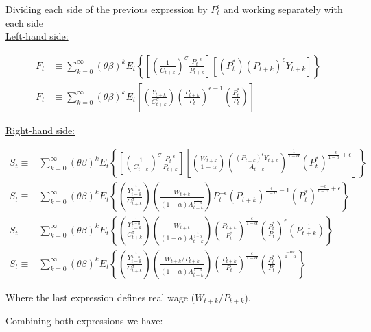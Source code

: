 \documentclass[11pt]{article}
\begin{document}
Dividing each side of the previous expression by $P_t^{\epsilon}$ and working separately with each side\\

\underline{Left-hand side:}

\begin{align*}
F_t&\equiv\sum_{k=0}^{\infty}(\theta\beta)^k E_t\left\{ \left[\left(\frac{1}{C_{t+k}}\right)^{\sigma}\frac{P_t^{-\epsilon}}{P_{t+k}}\right]\left[(P_t^*)(P_{t+k})^{\epsilon}Y_{t+k}\right]\right\}\\
F_t&\equiv\sum_{k=0}^{\infty}(\theta\beta)^k E_t\left[\left(\frac{Y_{t+k}}{C_{t+k}^{\sigma}}\right)\left(\frac{P_{t+k}}{P_{t}}\right)^{\epsilon-1}\left(\frac{P_t^*}{P_{t}}\right)\right]
\end{align*}

\underline{Right-hand side:}

\begin{align*}
S_t\equiv&\sum_{k=0}^{\infty}(\theta\beta)^k E_t\left\{ \left[\left(\frac{1}{C_{t+k}}\right)^{\sigma}\frac{P_t^{-\epsilon}}{P_{t+k}}\right]\left[\left(\frac{W_{t+k}}{1-\alpha}\right)\left(\frac{(P_{t+k})^{\epsilon}Y_{t+k}}{A_{t+k}}\right)^{\frac{1}{1-\alpha}}(P_t^*)^{\frac{-\epsilon}{1-\alpha}+\epsilon}\right]\right\}\\
S_t\equiv&\sum_{k=0}^{\infty}(\theta\beta)^k E_t\left\{ \left(\frac{Y_{t+k}^{\frac{1}{1-\alpha}}}{C_{t+k}^{\sigma}}\right)\left(\frac{W_{t+k}}{(1-\alpha)A_{t+k}^{\frac{1}{1-\alpha}}}\right)P_t^{-\epsilon}(P_{t+k})^{\frac{\epsilon}{1-\alpha}-1}(P_t^*)^{\frac{-\epsilon}{1-\alpha}+\epsilon}\right\}\\
S_t\equiv&\sum_{k=0}^{\infty}(\theta\beta)^k E_t\left\{ \left(\frac{Y_{t+k}^{\frac{1}{1-\alpha}}}{C_{t+k}^{\sigma}}\right)\left(\frac{W_{t+k}}{(1-\alpha)A_{t+k}^{\frac{1}{1-\alpha}}}\right)\left(\frac{P_{t+k}}{P_t^*}\right)^{\frac{\epsilon}{1-\alpha}}\left(\frac{P_{t}^*}{P_t}\right)^{\epsilon}(P_{t+k}^{-1})\right\}\\
S_t\equiv&\sum_{k=0}^{\infty}(\theta\beta)^k E_t\left\{ \left(\frac{Y_{t+k}^{\frac{1}{1-\alpha}}}{C_{t+k}^{\sigma}}\right)\left(\frac{W_{t+k}/P_{t+k}}{(1-\alpha)A_{t+k}^{\frac{1}{1-\alpha}}}\right)\left(\frac{P_{t+k}}{P_t}\right)^{\frac{\epsilon}{1-\alpha}}\left(\frac{P_{t}^*}{P_t}\right)^{\frac{-\alpha\epsilon}{1-\alpha}}\right\}
\end{align*}

Where the last expression defines real wage ($W_{t+k}/P_{t+k}$).

Combining both expressions we have:
\end{document}
